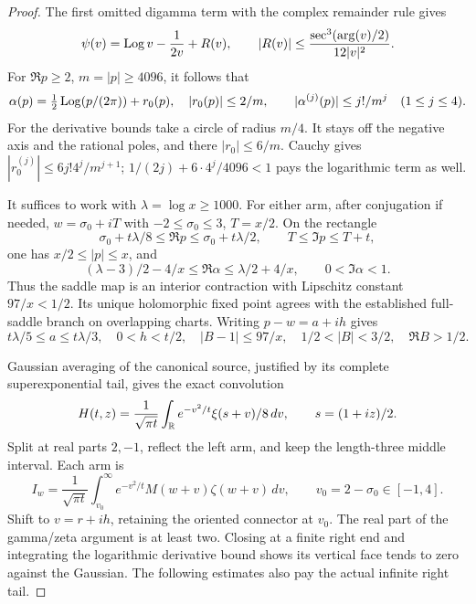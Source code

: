 \begin{proof}
The first omitted digamma term with the complex remainder rule
\cite{DLMFGammaOuter2026} gives
\[
 \psi(v)=\operatorname{Log} v-\frac1{2v}+R(v),\qquad
 |R(v)|\le\frac{\sec^3(\arg(v)/2)}{12|v|^2}.
\]
For $\Re p\ge2$, $m=|p|\ge4096$, it follows that
\begin{equation}
 \alpha(p)=\tfrac12\operatorname{Log}(p/(2\pi))+r_0(p),\quad |r_0(p)|\le2/m,
 \qquad |\alpha^{(j)}(p)|\le j!/m^j\quad(1\le j\le4).
 \label{eq:ef-alpha}
\end{equation}
For the derivative bounds take a circle of radius $m/4$. It stays off
the negative axis and the rational poles, and there $|r_0|\le6/m$.
Cauchy gives $|r_0^{(j)}|\le6j!4^j/m^{j+1}$;
$1/(2j)+6\cdot4^j/4096<1$ pays the logarithmic term as well.

It suffices to work with $\lambda=\log x\ge1000$. For either arm,
after conjugation if needed, $w=\sigma_0+iT$ with
$-2\le\sigma_0\le3$, $T=x/2$. On the rectangle
\[
 \sigma_0+t\lambda/8\le\Re p\le\sigma_0+t\lambda/2,
 \qquad T\le\Im p\le T+t,
\]
one has $x/2\le|p|\le x$, and
\[
 (\lambda-3)/2-4/x\le\Re\alpha\le\lambda/2+4/x,
 \qquad 0<\Im\alpha<1.
\]
Thus the saddle map is an interior contraction with Lipschitz constant
$97/x<1/2$. Its unique holomorphic fixed point agrees with the established
full-saddle branch on overlapping charts. Writing $p-w=a+ih$ gives
\begin{equation}
 t\lambda/5\le a\le t\lambda/3,\quad 0<h<t/2,\quad
 |B-1|\le97/x,\quad 1/2<|B|<3/2,\quad\Re B>1/2.
 \label{eq:ef-saddle}
\end{equation}

Gaussian averaging of the canonical source, justified by its complete
superexponential tail, gives the exact convolution
\[
 H(t,z)=\frac1{\sqrt{\pi t}}\int_\mathbb R e^{-v^2/t}\xi(s+v)/8\,dv,
 \qquad s=(1+iz)/2.
\]
Split at real parts $2,-1$, reflect the left arm, and keep the length-three
middle interval. Each arm is
\begin{equation}
 I_w=\frac1{\sqrt{\pi t}}\int_{v_0}^\infty
              e^{-v^2/t}M(w+v)\zeta(w+v)\,dv,
 \qquad v_0=2-\sigma_0\in[-1,4].
 \label{eq:ef-arm}
\end{equation}
Shift to $v=r+ih$, retaining the oriented connector at $v_0$.
The real part of the gamma/zeta argument is at least two. Closing at
a finite right end and integrating the logarithmic derivative bound
shows its vertical face tends to zero against the Gaussian. The
following estimates also pay the actual infinite right tail.


\end{proof}
